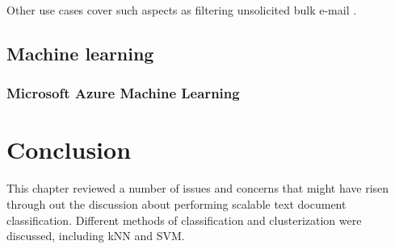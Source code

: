 		
	
	
	Other use cases cover such aspects as filtering unsolicited bulk e-mail \cite{naive-bayesian}. 
	\subsection{Machine learning}
		\subsubsection{Microsoft Azure Machine Learning}

\section{Conclusion}
This chapter reviewed a number of issues and concerns that might have risen through out the discussion about performing scalable text document classification. Different methods of classification and clusterization were discussed, including kNN and SVM.